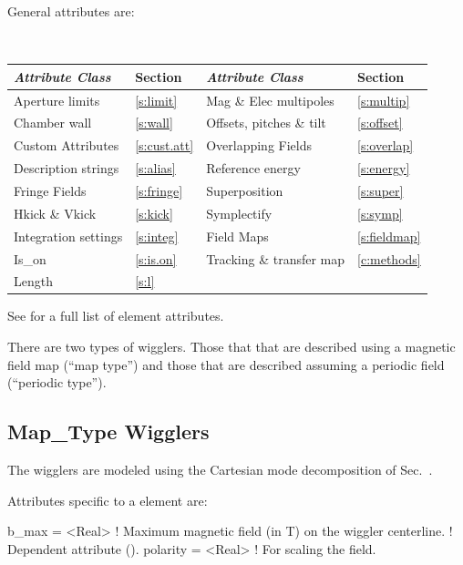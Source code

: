{General  attributes are:
\begin{center}
\tt
\begin{tabular}{llll} \toprule
  {\sl Attribute Class}      & Section           & {\sl Attribute Class}      & Section            \\ \midrule
  Aperture limits            & \ref{s:limit}     & Mag \& Elec multipoles     & \ref{s:multip}     \\
  Chamber wall               & \ref{s:wall}      & Offsets, pitches \& tilt   & \ref{s:offset}     \\
  Custom Attributes          & \ref{s:cust.att}  & Overlapping Fields         & \ref{s:overlap}    \\
  Description strings        & \ref{s:alias}     & Reference energy           & \ref{s:energy}     \\ 
  Fringe Fields              & \ref{s:fringe}    & Superposition              & \ref{s:super}      \\
  Hkick \& Vkick             & \ref{s:kick}      & Symplectify                & \ref{s:symp}       \\
  Integration settings       & \ref{s:integ}     & Field Maps                 & \ref{s:fieldmap}   \\
  Is_on                      & \ref{s:is.on}     & Tracking \& transfer map   & \ref{c:methods}    \\ 
  Length                     & \ref{s:l}         &                            &                    \\ 
  \bottomrule
\end{tabular}
\end{center}
\toffset
See  for a full list of element attributes.

There are two types of wigglers. Those that that are described using a
magnetic field map (``map type'') and those that are described
assuming a periodic field (``periodic type''). 

\subsection{Map\_Type Wigglers}
\label{s:wiggler.map}

The  wigglers are modeled using the Cartesian mode
decomposition of Sec.~. 

Attributes specific to a   element are:
\begin{example}
  b_max    = <Real>   ! Maximum magnetic field (in T) on the wiggler centerline. 
                      !   Dependent attribute ().
  polarity = <Real>   ! For scaling the field.
\end{example}

}
